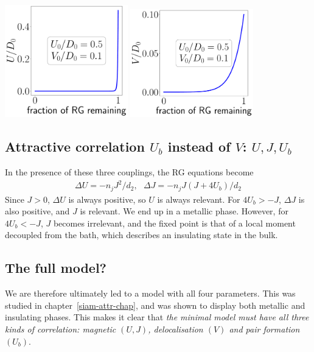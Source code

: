 \documentclass{report}
\numberwithin{equation}{section}
\begin{document}
\begin{center}
	\includegraphics[width=0.4\textwidth]{../figures/no_J_Ub=-0.10_D=100_U.pdf}
	\includegraphics[width=0.4\textwidth]{../figures/no_J_Ub=-0.10_D=100_V.pdf}
	\label{noJ_Ub_lt_0_D}
\end{center}

\subsection{Attractive correlation \(U_b\) instead of \(V\): \(U,J,U_b\)}
In the presence of these three couplings, the RG equations become
\begin{equation}\begin{aligned}
	\Delta U = -n_j J^2/d_2,~ ~ ~ \Delta J = -n_j J(J+4U_b)/d_2
\end{aligned}\end{equation}
Since \(J > 0\), \(\Delta U\) is always positive, so \(U\) is always relevant. For \(4U_b > -J\), \(\Delta J\) is also positive, and \(J\) is relevant. We end up in a metallic phase. However, for \(4U_b < -J\), \(J\) becomes irrelevant, and the fixed point is that of a local moment decoupled from the bath, which describes an insulating state in the bulk.

\subsection{The full model?}
We are therefore ultimately led to a model with all four parameters. This was studied in chapter~\ref{siam-attr-chap}, and was shown to display both metallic and insulating phases. This makes it clear that {\it the minimal model must have all three kinds of correlation: magnetic \((U,J)\), delocalisation \((V)\) and pair formation \((U_b)\)}.
\end{document}

